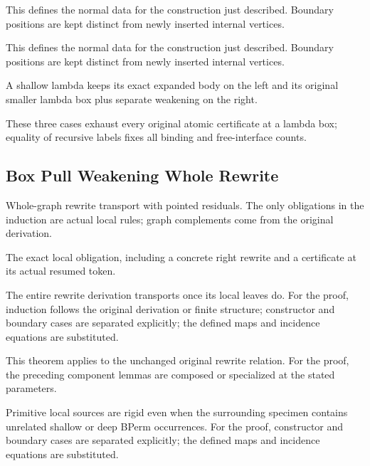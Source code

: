 This defines the normal data for the construction just described. Boundary positions are kept distinct from newly inserted internal vertices.
\par{}

This defines the normal data for the construction just described. Boundary positions are kept distinct from newly inserted internal vertices.
\par{}

A shallow lambda keeps its exact expanded body on the left and its original smaller lambda box plus separate weakening on the right.
\par{}

These three cases exhaust every original atomic certificate at a lambda box; equality of recursive labels fixes all binding and free-interface counts.
\par{}

\subsection{Box Pull Weakening Whole Rewrite}
Whole-graph rewrite transport with pointed residuals. The only obligations in the induction are actual local rules; graph complements come from the original derivation.

The exact local obligation, including a concrete right rewrite and a certificate at its actual resumed token.
\par{}

The entire rewrite derivation transports once its local leaves do.
For the proof, induction follows the original derivation or finite structure; constructor and boundary cases are separated explicitly; the defined maps and incidence equations are substituted.
\par{}

This theorem applies to the unchanged original rewrite relation.
For the proof, the preceding component lemmas are composed or specialized at the stated parameters.
\par{}

Primitive local sources are rigid even when the surrounding specimen contains unrelated shallow or deep BPerm occurrences.
For the proof, constructor and boundary cases are separated explicitly; the defined maps and incidence equations are substituted.
\par{}

